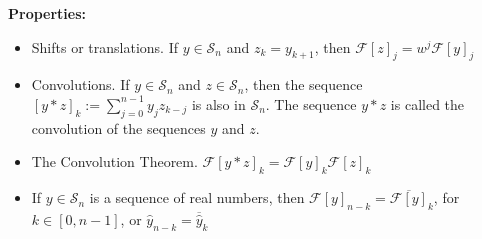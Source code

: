 {\bf Properties:} 
\begin{itemize}
\item Shifts or translations. If $y\in\mathcal{S}_n$ and $z_k=y_{k+1}$, then $\mathcal{F}[z]_j=w^j\mathcal{F}[y]_j$
\item Convolutions. If $y\in\mathcal{S}_n$ and $z\in\mathcal{S}_n$, then the sequence \newline $[y*z]_k:=\sum_{j=0}^{n-1}y_jz_{k-j}$ is also in $\mathcal{S}_n$. The sequence $y*z$ is called the convolution of the sequences $y$ and $z$.
\item The Convolution Theorem. $\mathcal{F}[y*z]_k=\mathcal{F}[y]_k\mathcal{F}[z]_k$
\item If $y\in\mathcal{S}_n$ is a sequence of real numbers, then $\mathcal{F}[y]_{n-k}=\overline{\mathcal{F}[y]}_k$, for $k\in[0,n-1]$, or $\hat{y}_{n-k}=\overline{\hat{y}}_k$
\end{itemize}